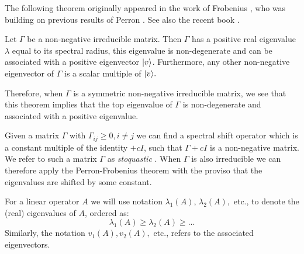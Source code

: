 The following theorem originally appeared
in the work of Frobenius \cite{Frobenius1912}, who
was building on previous results of Perron \cite{Perron1907}.
See also the recent book \cite{Baez2012}.

Let $\Gamma$ be a non-negative irreducible matrix.
Then $\Gamma$ has a positive real eigenvalue
$\lambda$ equal to its spectral radius,
this eigenvalue is non-degenerate and can be associated 
with a positive eigenvector $|{v}\rangle$.
Furthermore, any other non-negative eigenvector of 
$\Gamma$ is a scalar multiple of $|{v}\rangle.$
\tombstone

Therefore, when $\Gamma$ is a symmetric non-negative irreducible matrix,
we see that this theorem implies that the top eigenvalue of $\Gamma$ is
non-degenerate and associated with a positive eigenvalue.

Given a matrix $\Gamma$ with $\Gamma_{ij}\ge 0, i\ne j$ we can
find a spectral shift operator which is a constant multiple of the identity $+cI$,
such that $\Gamma+cI$ is a non-negative matrix. 
We refer to such a matrix $\Gamma$ as \emph{stoquastic} \cite{Bravyi2008,Bravyi2015}.
When $\Gamma$ is also irreducible we can therefore apply the Perron-Frobenius
theorem with the proviso that the eigenvalues are shifted by some constant.

For a linear operator $A$ we will use notation 
$\lambda_1(A)$, $\lambda_2(A),$ etc., to denote the (real) eigenvalues of $A$,
ordered as:
$$
    \lambda_1(A) \ge \lambda_2(A) \ge ...
$$
Similarly, the notation $v_1(A), v_2(A),$ etc., refers to the associated eigenvectors.



